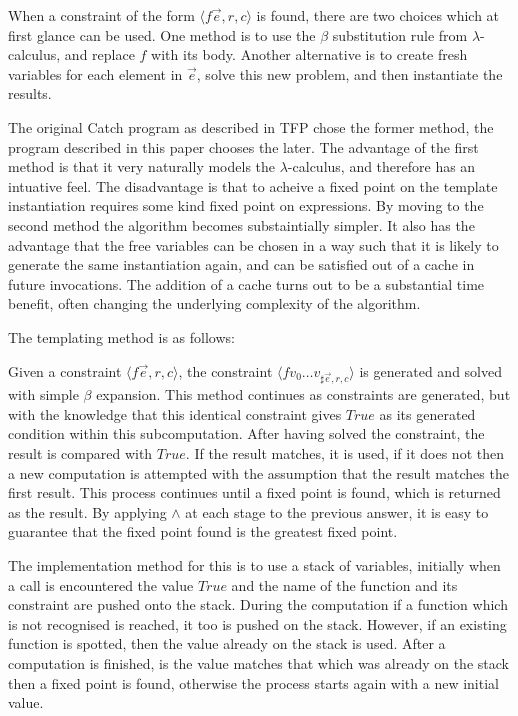 \documentclass[preprint]{sigplanconf}
\newcommand{\tup}[1]{\langle #1 \rangle}
\begin{document}
When a constraint of the form $\tup{f \overrightarrow{e},r,c}$ is found, there
are two choices which at first glance can be used. One method is to use the
$\beta$ substitution rule from $\lambda$-calculus, and replace $f$ with its
body. Another alternative is to create fresh variables for each element in
$\overrightarrow{e}$, solve this new problem, and then instantiate the results.

The original Catch program as described in TFP chose the former method, the
program described in this paper chooses the later. The advantage of the first
method is that it very naturally models the $\lambda$-calculus, and therefore
has an intuative feel. The disadvantage is that to acheive a fixed point on the
template instantiation requires some kind fixed point on expressions. By moving
to the second method the algorithm becomes substaintially simpler. It also has
the advantage that the free variables can be chosen in a way such that it is
likely to generate the same instantiation again, and can be satisfied out of a
cache in future invocations. The addition of a cache turns out to be a
substantial time benefit, often changing the underlying complexity of the
algorithm.

The templating method is as follows:

Given a constraint $\tup{f \overrightarrow{e},r,c}$, the constraint %
$\tup{f v_0\ldots v_{\sharp \overrightarrow{e},r,c}}$ is generated and solved
with simple $\beta$ expansion. This method continues as constraints are
generated, but with the knowledge that this identical constraint gives $True$
as its generated condition within this subcomputation. After having solved the
constraint, the result is compared with $True$. If the result matches, it is
used, if it does not then a new computation is attempted with the assumption
that the result matches the first result. This process continues until a fixed
point is found, which is returned as the result. By applying $\wedge$ at each
stage to the previous answer, it is easy to guarantee that the fixed point
found is the greatest fixed point.

The implementation method for this is to use a stack of variables, initially
when a call is encountered the value $True$ and the name of the function and
its constraint are pushed onto the stack. During the computation if a function
which is not recognised is reached, it too is pushed on the stack. However, if
an existing function is spotted, then the value already on the stack is used.
After a computation is finished, is the value matches that which was already on
the stack then a fixed point is found, otherwise the process starts again with
a new initial value.
\end{document}
